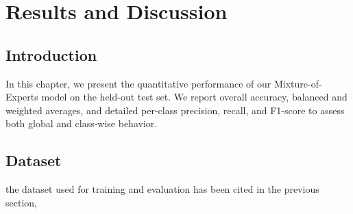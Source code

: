 \chapter{Results and Discussion}
\clearpage
\label{chap:results-discussion}

\section{Introduction}
In this chapter, we present the quantitative performance of our Mixture-of-Experts model on the held-out test set. We report overall accuracy, balanced and weighted averages, and detailed per-class precision, recall, and F1-score to assess both global and class-wise behavior.
\section{Dataset}
the dataset used for training and evaluation has been cited in the previous section,

